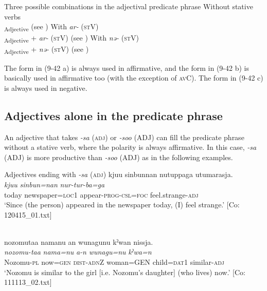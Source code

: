 \ea   Three possible combinations in the adjectival predicate phrase\label{ex:9.42}
\ea Without stative verbs\\\textsubscript{Adjective}  (see )
\ex  With \textit{ar-} (\textsc{st}V)\\\textsubscript{Adjective}  + \textit{ar-} (\textsc{st}V)  (see )
\ex With \textit{nə-} (\textsc{st}V)\\\textsubscript{Adjective}  + \textit{nə-} (\textsc{st}V)  (see )
    \z
\z

The form in (9-42 a) is always used in affirmative, and the form in (9-42 b) is basically used in affirmative too (with the exception of \textsc{av}C). The form in (9-42 c) is always used in negative.

\subsection{Adjectives alone in the predicate phrase}\label{sec:9.2.1}

An adjective that takes \textit{{}-sa} (\textsc{adj}) or \textit{{}-soo} (ADJ) can fill the predicate phrase without a stative verb, where the polarity is always affirmative. In this case, \textit{{}-sa} (ADJ) is more productive than \textit{{}-soo} (ADJ) as in the following examples.

\ea   \label{ex:9.43}
\exi{} Adjectives ending with \textit{{}-sa} (\textsc{adj})
\ea %
 \glll  kjuu  sinbunnan  nutuppaga  utumarasja.\\
      \textit{kjuu}  \textit{sinbun=nan}  \textit{nur-tur-ba=ga}  \textit{}\\
      today  newspaper=\textsc{loc}1  appear-\textsc{prog}-\textsc{csl}=\textsc{foc}  feel.strange-\textsc{adj}\\
      \glt       ‘Since (the person) appeared in the newspaper today, (I) feel strange.’ [Co: 120415\_01.txt]

  \ex{}\\
\glll nozomutaa  namanu  an  wunagunu  kˀwan   nissja.\\
      \textit{nozomu-taa}  \textit{nama=nu}  \textit{a-n}  \textit{wunagu=nu}  \textit{kˀwa=n} \textit{}\\
      Nozomu-\textsc{pl}  now=\textsc{gen}  \textsc{dist}-\textsc{adn}Z  woman=GEN  child=\textsc{dat}1  similar-\textsc{adj}\\
      \glt    ‘Nozomu is similar to the girl [i.e. Nozomu’s daughter] (who lives) now.’  [Co: 111113\_02.txt]

